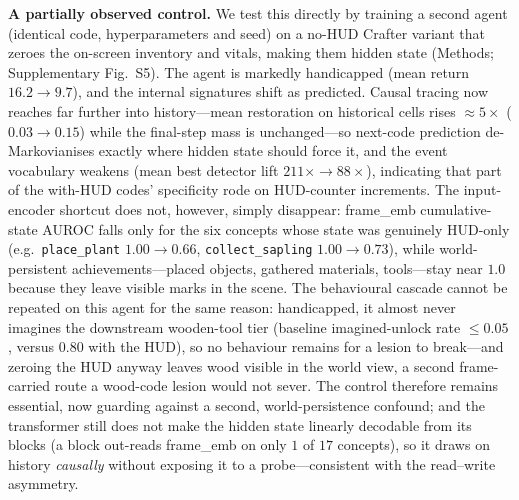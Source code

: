 \documentclass[pdflatex,sn-mathphys-num]{sn-jnl}%
\theoremstyle{thmstyleone}%
\theoremstyle{thmstyletwo}%
\theoremstyle{thmstylethree}%
\newcommand{\achname}[1]{\texttt{#1}}
\begin{document}
\textbf{A partially observed control.} We test this directly by training a second agent (identical code, hyperparameters and seed) on a no-HUD Crafter variant that zeroes the on-screen inventory and vitals, making them hidden state (Methods; Supplementary Fig.~S5). The agent is markedly handicapped (mean return $16.2\to9.7$), and the internal signatures shift as predicted. Causal tracing now reaches far further into history---mean restoration on historical cells rises $\approx\!5\times$ ($0.03\to0.15$) while the final-step mass is unchanged---so next-code prediction de-Markovianises exactly where hidden state should force it, and the event vocabulary weakens (mean best detector lift $211\times\to88\times$), indicating that part of the with-HUD codes' specificity rode on HUD-counter increments. The input-encoder shortcut does not, however, simply disappear: \textsf{frame\_emb} cumulative-state AUROC falls only for the six concepts whose state was genuinely HUD-only (e.g.\ \achname{place\_plant} $1.00\to0.66$, \achname{collect\_sapling} $1.00\to0.73$), while world-persistent achievements---placed objects, gathered materials, tools---stay near $1.0$ because they leave visible marks in the scene. The behavioural cascade cannot be repeated on this agent for the same reason: handicapped, it almost never imagines the downstream wooden-tool tier (baseline imagined-unlock rate $\le0.05$, versus $0.80$ with the HUD), so no behaviour remains for a lesion to break---and zeroing the HUD anyway leaves wood visible in the world view, a second frame-carried route a wood-code lesion would not sever. The control therefore remains essential, now guarding against a second, world-persistence confound; and the transformer still does not make the hidden state linearly decodable from its blocks (a block out-reads \textsf{frame\_emb} on only $1$ of $17$ concepts), so it draws on history \emph{causally} without exposing it to a probe---consistent with the read--write asymmetry.
\end{document}
